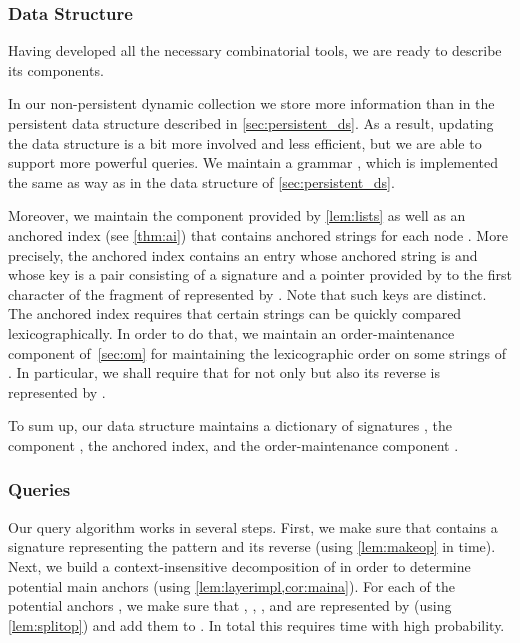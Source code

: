 \documentclass[a4paper]{article}
\theoremstyle{remark}
\begin{document}
\subsubsection{Data Structure}
Having developed all the necessary combinatorial tools, we are ready to describe its components.

In our non-persistent dynamic collection we store more information than in the persistent data structure described in \cref{sec:persistent_ds}.
As a result, updating the data structure is a bit more involved and less efficient, but we are able to support more powerful queries.
We maintain a grammar , which is implemented the same as way as in the data structure of \cref{sec:persistent_ds}.


Moreover, we maintain the component  provided by \cref{lem:lists} as well as an anchored index (see \cref{thm:ai}) that contains anchored strings  for each node .
More precisely, the anchored index contains an entry  whose anchored string is 
and whose key is a pair consisting of a signature  and a pointer provided by  to the first character
of the fragment of  represented by . Note that such keys are distinct.
The anchored index requires that certain strings can be quickly compared lexicographically.
In order to do that, we maintain an order-maintenance component  of~\cref{sec:om} for maintaining the lexicographic order
on some strings of . In particular, we shall require that for  not only  but also its reverse
is represented by .

To sum up, our data structure maintains a dictionary of signatures ,  the component ,
the anchored index, and the order-maintenance component .
\subsubsection{Queries}

Our query algorithm works in several steps. First, we make sure that  contains a signature representing the pattern  and its reverse  (using \cref{lem:makeop} in  time).
Next, we build a context-insensitive decomposition of  in order to determine  potential main anchors  (using \cref{lem:layerimpl,cor:maina}).
For each of the  potential anchors , we make sure that , , , and 
are represented by  (using \cref{lem:splitop}) and add them to .
In total this requires  time with high probability.
\end{document}

